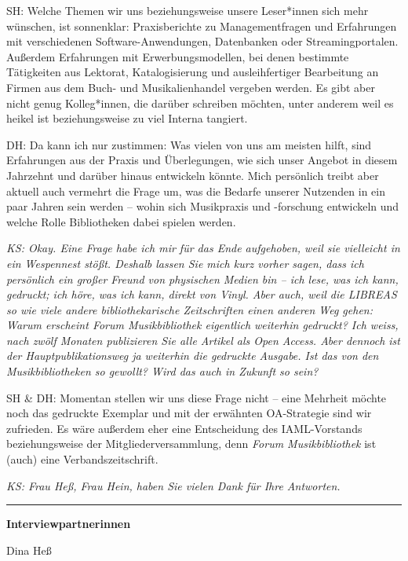 \documentclass[a4paper,
fontsize=11pt,
oneside,
numbers=noperiodatend,
parskip=half-,
bibliography=totoc,
final
]{scrartcl}
\begin{document}
SH: Welche Themen wir uns beziehungsweise unsere Leser*innen sich mehr
wünschen, ist sonnenklar: Praxisberichte zu Managementfragen und
Erfahrungen mit verschiedenen Software-Anwendungen, Datenbanken oder
Streamingportalen. Außerdem Erfahrungen mit Erwerbungsmodellen, bei
denen bestimmte Tätigkeiten aus Lektorat, Katalogisierung und
ausleihfertiger Bearbeitung an Firmen aus dem Buch- und Musikalienhandel
vergeben werden. Es gibt aber nicht genug Kolleg*innen, die darüber
schreiben möchten, unter anderem weil es heikel ist beziehungsweise zu
viel Interna tangiert.

DH: Da kann ich nur zustimmen: Was vielen von uns am meisten hilft, sind
Erfahrungen aus der Praxis und Überlegungen, wie sich unser Angebot in
diesem Jahrzehnt und darüber hinaus entwickeln könnte. Mich persönlich
treibt aber aktuell auch vermehrt die Frage um, was die Bedarfe unserer
Nutzenden in ein paar Jahren sein werden -- wohin sich Musikpraxis und
\mbox{-forschung} entwickeln und welche Rolle Bibliotheken dabei spielen
werden.

\emph{KS: Okay. Eine Frage habe ich mir für das Ende aufgehoben, weil
sie vielleicht in ein Wespennest stößt. Deshalb lassen Sie mich kurz
vorher sagen, dass ich persönlich ein großer Freund von physischen
Medien bin -- ich lese, was ich kann, gedruckt; ich höre, was ich kann,
direkt von Vinyl. Aber auch, weil die LIBREAS so wie viele andere
bibliothekarische Zeitschriften einen anderen Weg gehen: Warum erscheint
Forum Musikbibliothek eigentlich weiterhin gedruckt? Ich weiss, nach
zwölf Monaten publizieren Sie alle Artikel als Open Access. Aber dennoch
ist der Hauptpublikationsweg ja weiterhin die gedruckte Ausgabe. Ist das
von den Musikbibliotheken so gewollt? Wird das auch in Zukunft so sein?}

SH \& DH: Momentan stellen wir uns diese Frage nicht -- eine Mehrheit
möchte noch das gedruckte Exemplar und mit der erwähnten OA-Strategie
sind wir zufrieden. Es wäre außerdem eher eine Entscheidung des
IAML-Vorstands beziehungsweise der Mitgliederversammlung, denn
\emph{Forum Musikbibliothek} ist (auch) eine Verbandszeitschrift.

\emph{KS: Frau Heß, Frau Hein, haben Sie vielen Dank für Ihre
Antworten.}

\begin{center}\rule{0.5\linewidth}{0.5pt}\end{center}

\textbf{Interviewpartnerinnen}

Dina Heß
\end{document}
